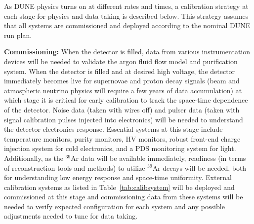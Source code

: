 As DUNE physics turns on at different rates and times, a calibration strategy at each stage for physics and data taking is described below. This strategy assumes that all systems are commissioned and deployed according to the nominal DUNE run plan. 

\textbf{Commissioning:} When the detector is filled, data from various instrumentation devices will be needed to validate the argon fluid flow model and purification system. When the detector is filled and at desired high voltage, the detector immediately becomes live for supernovae and proton decay signals (beam and atmospheric neutrino physics will require a few years of data accumulation) at which stage it is critical for early calibration to track the space-time dependence of the detector. Noise data (taken with wires off) and pulser data (taken with signal calibration pulses injected into electronics) will be needed to understand the detector electronics response. Essential systems at this stage include temperature monitors, purity monitors, HV monitors, robust front-end charge injection system for cold electronics, and a PDS monitoring system for light. Additionally, as the $^{39}$Ar data will be available immediately, readiness (in terms of reconstruction tools and methods) to utilize $^{39}$Ar decays will be needed, both for understanding low energy response and space-time uniformity. External calibration systems as listed in Table~\ref{tab:calibsystem} will be deployed and commissioned at this stage and commissioning data from these systems will be needed to verify expected configuration for each system and any possible adjustments needed to tune for data taking.


